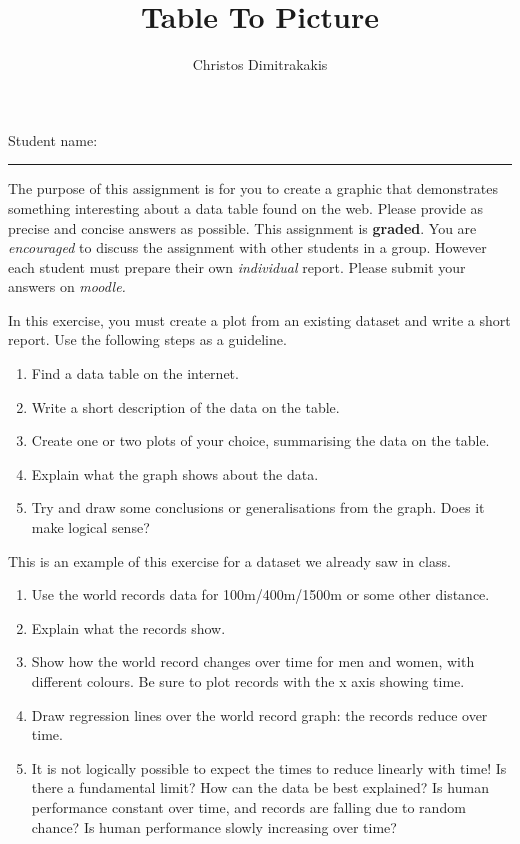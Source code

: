 \documentclass[a4paper]{article}
\title{Table To Picture}
\author{Christos Dimitrakakis}
\begin{document}
\maketitle

{\Large Student name:} \vspace{0.5em} \hrule \vspace{1em}

The purpose of this assignment is for you to create a graphic that
demonstrates something interesting about a data table found on the
web.  Please provide as precise and concise answers as possible. This
assignment is \textbf{graded}. You are \emph{encouraged} to discuss
the assignment with other students in a group. However each student
must prepare their own \emph{individual} report.  Please submit your
answers on \emph{moodle.}

\begin{exercise}
  In this exercise, you must create a plot from an existing dataset and write a short report. Use the following steps as a guideline.
  \begin{enumerate}
  \item Find a data table on the internet. 
  \item Write a short description of the data on the table.
  \item Create one or two plots of your choice, summarising the data on the table.
  \item Explain what the graph shows about the data.
  \item Try and draw some conclusions or generalisations from the graph. Does it make logical sense?
  \end{enumerate}
\end{exercise}

\begin{example}
  This is an example of this exercise for a dataset we already saw in class.
  \begin{enumerate}
  \item Use the world records data for 100m/400m/1500m or some other distance.
  \item Explain what the records show.
  \item Show how the world record changes over time for men and women,
    with different colours. Be sure to plot records with the x axis
    showing time.
  \item Draw regression lines over the world record graph: the records reduce over time.
  \item It is not logically possible to expect the times to reduce linearly with time! Is there a fundamental limit? How can the data be best explained? Is human performance constant over time, and records are falling due to random chance? Is human performance slowly increasing over time?
  \end{enumerate}
\end{example}
\end{document}
